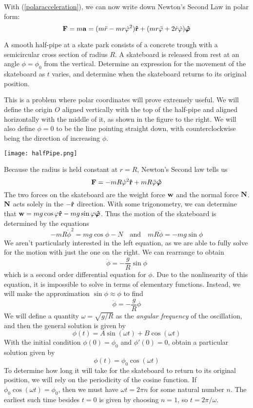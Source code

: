 With (\ref{polaracceleration}), we can now write down Newton's Second Law in polar form:
\[ \mathbf{F} = m\mathbf{a} = (m\ddot r - mr\dot{\varphi}^2)\mathbf{\hat{r}} + (mr\ddot {\varphi} + 2\dot{r}\dot{\varphi})\bm{\hat{\varphi}}\]
\begin{example}
    A smooth half-pipe at a skate park consists of a concrete trough with a semicircular cross section of radius $R$. A skateboard is released from rest at an angle $\phi=\phi_0$ from the vertical. Determine an expression for the movement of the skateboard as $t$ varies, and determine when the skateboard returns to its original position.   
    
    \begin{minipage}{0.48\textwidth}
        This is a problem where polar coordinates will prove extremely useful. We will define the origin $O$ aligned vertically with the top of the half-pipe and aligned horizontally with the middle of it, as shown in the figure to the right. We will also define $\phi=0$ to be the line pointing straight down, with counterclockwise being the direction of increasing $\phi$.
    \end{minipage}
    \begin{minipage}{0.48\textwidth}
        \parbox{\textwidth}{
            \label{half-pipe}
            \texttt{[image: halfPipe.png]}
        }
    \end{minipage}
    
    Because the radius is held constant at $r=R$, Newton's Second law tells us 
    \[ \mathbf{F} = -mR\dot{\varphi}^2\mathbf{\hat{r}} + mR\ddot{\varphi}\bm{\hat{\varphi}} \]
    The two forces on the skateboard are the weight force $\mathbf{w}$ and the normal force $\mathbf{N}$. $\mathbf{N}$ acts solely in the $-\mathbf{\hat{r}}$ direction. With some trigonometry, we can determine that $\mathbf{w} = mg\cos\varphi\mathbf{\hat{r}} - mg\sin\varphi\bm{\hat{\varphi}}$. Thus the motion of the skateboard is determined by the equations
    \[ -mR\dot{\phi}^2 = mg\cos\phi - N \quad \text{and} \quad mR\ddot{\phi} = -mg\sin\phi\]
    We aren't particularly interested in the left equation, as we are able to fully solve for the motion with just the one on the right. We can rearrange to obtain
    \[ \ddot\phi = -\frac{g}{R}\sin\phi \]
    which is a second order differential equation for $\phi$. Due to the nonlinearity of this equation, it is impossible to solve in terms of elementary functions. Instead, we will make the approximation $\sin\phi\approx\phi$ to find 
    \[ \ddot\phi = -\frac{g}{R}\phi \]
    We will define a quantity $\omega = \sqrt{g/R}$ as the \textit{angular frequency} of the oscillation, and then the general solution is given by
    \[ \phi(t) = A\sin(\omega t) + B\cos(\omega t)\]
    With the initial condition $\phi(0) = \phi_0$ and $\phi'(0)=0$, obtain a particular solution given by
    \[ \phi(t) = \phi_0\cos(\omega t)\]
    To determine how long it will take for the skateboard to return to its original position, we will rely on the periodicity of the cosine function. If $\phi_0\cos(\omega t) = \phi_0$, then we must have $\omega t = 2\pi n$ for some natural number $n$. The earliest such time besides $t=0$ is given by choosing $n=1$, so $t = 2\pi/\omega$. 


\end{example}
